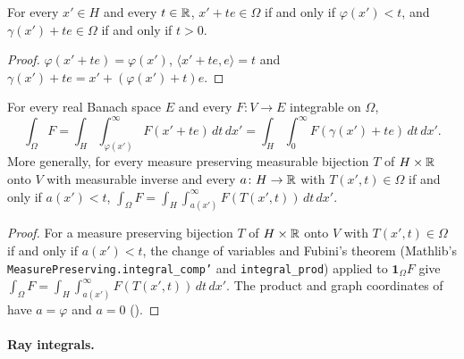 \begin{lemma}
\label{lem:graph-product-coordinates}
\leanok
{}
For every $x' \in H$ and every $t \in \mathbb{R}$, $x' + t e \in \Omega$ if and only if
$\varphi(x') < t$, and $\gamma(x') + t e \in \Omega$ if and only if $t > 0$.
\end{lemma}

\begin{proof}
\leanok
$\varphi(x' + t e) = \varphi(x')$, $\langle x' + t e, e \rangle = t$ and
$\gamma(x') + t e = x' + (\varphi(x') + t) e$.
\end{proof}

\begin{theorem}
\label{thm:graph-fubini}
\leanok
{}
For every real Banach space $E$ and every $F \colon V \to E$ integrable on $\Omega$,
\[
  \int_\Omega F = \int_H \int_{\varphi(x')}^\infty F(x' + t e) \, dt \, dx'
  = \int_H \int_0^\infty F(\gamma(x') + t e) \, dt \, dx' .
\]
More generally, for every measure preserving measurable bijection $T$ of $H \times \mathbb{R}$ onto $V$
with measurable inverse and every $a \colon H \to \mathbb{R}$ with $T(x', t) \in \Omega$ if and only if
$a(x') < t$,
$\int_\Omega F = \int_H \int_{a(x')}^\infty F(T(x', t)) \, dt \, dx'$.
\end{theorem}

\begin{proof}
\leanok
For a measure preserving bijection $T$ of $H \times \mathbb{R}$ onto $V$ with $T(x', t) \in \Omega$ if
and only if $a(x') < t$, the change of variables and Fubini's theorem (Mathlib's
\texttt{MeasurePreserving.\allowbreak integral\_\allowbreak comp'} and
\texttt{integral\_\allowbreak prod}) applied to $\mathbf 1_\Omega F$ give
$\int_\Omega F = \int_H \int_{a(x')}^\infty F(T(x', t)) \, dt \, dx'$. The product and graph
coordinates of  have $a = \varphi$ and $a = 0$
().
\end{proof}

\paragraph{Ray integrals.}

